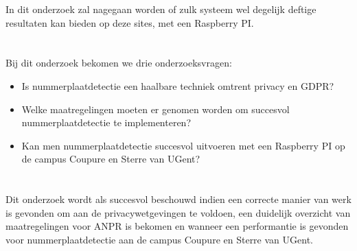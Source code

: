In dit onderzoek zal nagegaan worden of zulk systeem wel degelijk deftige resultaten kan bieden op deze sites, met een Raspberry PI.

\section{}
\label{sec:onderzoeksvraag}

Bij dit onderzoek bekomen we drie onderzoeksvragen:
\begin{itemize}
	\item Is nummerplaatdetectie een haalbare techniek omtrent privacy en GDPR?
	\item Welke maatregelingen moeten er genomen worden om succesvol nummerplaatdetectie te implementeren?
	\item Kan men nummerplaatdetectie succesvol uitvoeren met een Raspberry PI op de campus Coupure en Sterre van UGent?
\end{itemize}

\section{}
\label{sec:onderzoeksdoelstelling}


Dit onderzoek wordt als succesvol beschouwd indien een correcte manier van werk is gevonden om aan de privacywetgevingen te voldoen, een duidelijk overzicht van maatregelingen voor ANPR is bekomen en wanneer een performantie is gevonden voor nummerplaatdetectie aan de campus Coupure en Sterre van UGent.

\section{}
\label{sec:opzet-bachelorproef}

